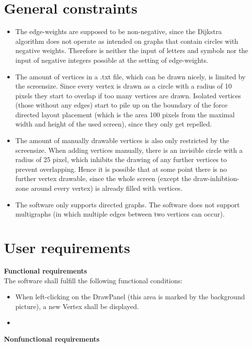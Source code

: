 \documentclass{article}
\begin{document}
\section{General constraints}
\begin{itemize}
\item The edge-weights are supposed to be non-negative, since the Dijkstra algorithm does not operate as intended on graphs that contain circles with negative weights. Therefore is neither the input of letters and symbols nor the input of negative integers possible at the setting of edge-weights.
\item The amount of vertices in a .txt file, which can be drawn nicely, is limited by the screensize. Since every vertex is drawn as a circle with a radius of 10 pixels they start to overlap if too many vertices are drawn. Isolated vertices (those without any edges) start to pile up on the boundary of the force directed layout placement (which is the area 100 pixels from the maximal width and height of the used screen), since they only get repelled.
\item The amount of manually drawable vertices is also only restricted by the screensize. When adding vertices manually, there is an invisible circle with a radius of 25 pixel, which inhibits the drawing of any further vertices to prevent overlapping. Hence it is possible that at some point there is no further vertex drawable, since the whole screen (except the draw-inhibtion-zone around every vertex) is already filled with vertices.
\item The software only supports directed graphs. The software does not support multigraphs (in which multiple edges between two vertices can occur).
\end{itemize}

\section{User requirements}
\textbf{Functional requirements} \\
The software shall fulfill the following functional conditions:
\begin{itemize}
\item When left-clicking on the DrawPanel (this area is marked by the background picture), a new Vertex shall be displayed.
\item 
\end{itemize}  

\textbf{Nonfunctional requirements} \\
\end{document}
